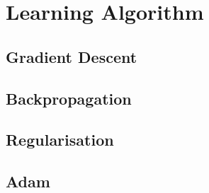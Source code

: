 \section{Learning Algorithm}
\subsection{Gradient Descent}
\subsection{Backpropagation}
\subsection{Regularisation}
\label{early_stopping}
\subsection{Adam}